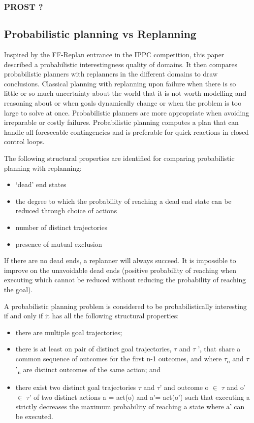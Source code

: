 \documentclass[runningheads,a4paper]{llncs}
\begin{document}
\subsubsection{PROST ?}


\subsection{Probabilistic planning vs Replanning}
Inspired by the FF-Replan entrance in the IPPC competition, this paper described a probabilistic interestingness quality of domains. It then compares probabilistic planners with replanners in the different domains to draw conclusions. Classical planning with replanning upon failure when there is so little or so much uncertainty about the world that it is not worth modelling and reasoning about or when goals dynamically change or when the problem is too large to solve at once. Probabilistic planners are more appropriate when avoiding irreparable or costly failures. Probabilistic planning computes a plan that can handle all foreseeable contingencies and is preferable for quick reactions in closed control loops.

The following structural properties are identified for comparing probabilistic planning with replanning:
\begin{itemize}
	\item `dead' end states
	\item the degree to which the probability of reaching a dead end state can be reduced through choice of actions
	\item number of distinct trajectories
	\item presence of mutual exclusion
\end{itemize}

If there are no dead ends, a replanner will always succeed. It is impossible to improve on the unavoidable dead ends (positive probability of reaching when executing which cannot be reduced without reducing the probability of reaching the goal).


A probabilistic planning problem is considered to be probabilistically interesting if and only if it has all the following structural properties:

\begin{itemize}
	\item there are multiple goal trajectories;
	\item there is at least on pair of distinct goal trajectories, $\tau$ and $\tau$ ', that share a common sequence of outcomes for the first n-1 outcomes, and where $\tau$\textsubscript{n} and $\tau$'\textsubscript{n} are distinct outcomes of the same action; and
	\item there exist two distinct goal trajectories $\tau$ and $\tau$' and outcome o $\in$ $\tau$ and o' $\in$ $\tau$' of two distinct actions a = act(o) and a'= act(o') such that executing a strictly decreases the maximum probability of reaching a state where a' can be executed.
\end{itemize}
\end{document}
